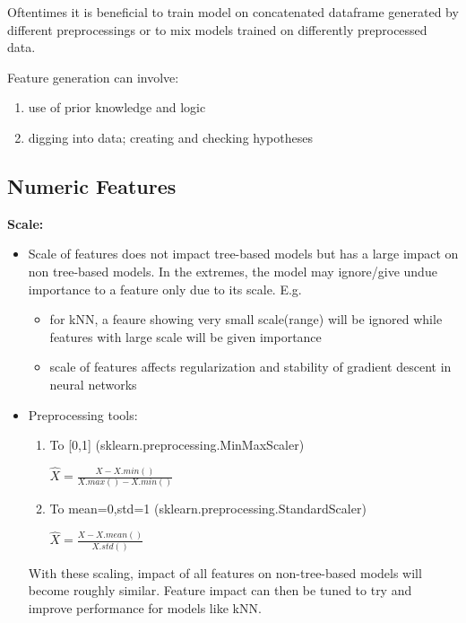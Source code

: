\documentclass[a4paper]{article}
\begin{document}
Oftentimes it is beneficial to train model on concatenated dataframe generated by different preprocessings or to mix models trained on differently preprocessed data.

Feature generation can involve:
\begin{enumerate}
\item use of prior knowledge and logic
\item digging into data; creating and checking hypotheses
\end{enumerate}

\subsection{Numeric Features}
\textbf{Scale:}
\begin{itemize}
\item Scale of features does not impact tree-based models but has a large impact on non tree-based models. In the extremes, the model may ignore/give undue importance to a feature only due to its scale. E.g.
	\begin{itemize}
	\item for kNN, a feaure showing very small scale(range) will be ignored while features with large scale will be given importance
	\item scale of features affects regularization and stability of gradient descent in neural networks 
	\end{itemize}
\item Preprocessing tools:
	\begin{enumerate}
	\item To [0,1] (sklearn.preprocessing.MinMaxScaler)

		$\hat{X} = \frac{X - X.min()}{X.max() - X.min()}$

	\item To mean=0,std=1 (sklearn.preprocessing.StandardScaler)
		
		$\hat{X} = \frac{X - X.mean()}{X.std()}$
		
	\end{enumerate}
With these scaling, impact of all features on non-tree-based models will become roughly similar. Feature impact can then be tuned to try and improve performance for models like kNN.
\end{itemize}
\end{document}
